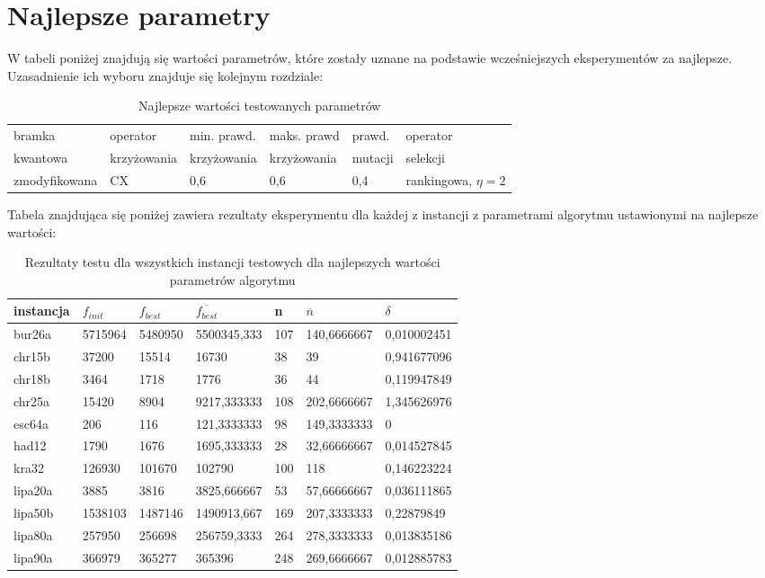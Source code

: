 \section{Najlepsze parametry}
W tabeli poniżej znajdują się wartości parametrów, które zostały uznane na podstawie wcześniejszych eksperymentów za najlepsze. Uzasadnienie ich wyboru znajduje się kolejnym rozdziale:

\begin{table}[H]
\label{best_param}
\begin{tabular}{l l l l l l}
\hline
bramka & operator & min. prawd. & maks. prawd & prawd. & operator \\
kwantowa & krzyżowania & krzyżowania & krzyżowania & mutacji & selekcji\\
\hline
zmodyfikowana & CX & 0,6 & 0,6 & 0,4 & rankingowa, $\eta=2$\\
\hline
\end{tabular}
\caption{Najlepsze wartości testowanych parametrów}
\end{table}

Tabela znajdująca się poniżej zawiera rezultaty eksperymentu dla każdej z instancji z parametrami algorytmu ustawionymi na najlepsze wartości:

\begin{table}[H]
\label{test_best_param}
\begin{tabular}{l l l l l l l}
\hline
instancja & $f_{init}$ & $f_{best}$ & $\overline{f_{best}}$ & n & $\overline{n}$ & $\delta$\\
\hline
bur26a & 5715964 & 5480950 & 5500345,333 & 107 & 140,6666667 & 0,010002451\\
chr15b & 37200 & 15514 & 16730 & 38 & 39 & 0,941677096\\
chr18b & 3464 & 1718 & 1776 & 36 & 44 & 0,119947849\\
chr25a & 15420 & 8904 & 9217,333333 & 108 & 202,6666667 & 1,345626976\\
esc64a & 206 & 116 & 121,3333333 & 98 & 149,3333333 & 0\\
had12 & 1790 & 1676 & 1695,333333 & 28 & 32,66666667 & 0,014527845\\
kra32 & 126930 & 101670 & 102790 & 100 & 118 & 0,146223224\\
lipa20a & 3885 & 3816 & 3825,666667 & 53 & 57,66666667 & 0,036111865\\
lipa50b & 1538103 & 1487146 & 1490913,667 & 169 & 207,3333333 & 0,22879849\\
lipa80a & 257950 & 256698 & 256759,3333 & 264 & 278,3333333 & 0,013835186\\
lipa90a & 366979 & 365277 & 365396 & 248 & 269,6666667 & 0,012885783\\
\hline
\end{tabular}
\caption{Rezultaty testu dla wszystkich instancji testowych dla najlepszych wartości parametrów algorytmu}
\end{table}